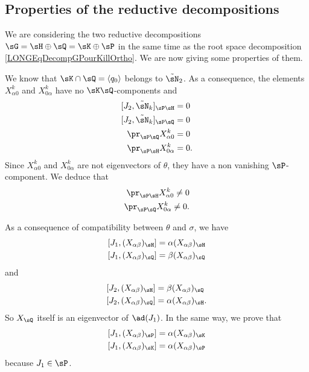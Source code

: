 %
\subsection{Properties of the reductive decompositions}
%
\label{LONGSubSecPropRedDecompQH}

We are considering the two reductive decompositions $\sG=\sH\oplus\sQ=\sK\oplus\sP$ in the same time as the root space decomposition \eqref{LONGEqDecompGPourKillOrtho}. We are now giving some properties of them.


We know that $\sK\cap\sQ=\langle q_0\rangle$ belongs to $\tilde\sN_2$. As a consequence, the elements $X^k_{\alpha 0}$ and $X^k_{0\alpha}$ have no $\sK\sQ$-components and
\begin{equation}
	\begin{aligned}[]
		[J_2,\tilde\sN_k]_{\sP\sH}&=0\\
		[J_2,\tilde\sN_k]_{\sP\sQ}&=0\\
		\pr_{\sP\sQ}X_{\alpha 0}^k&=0\\
		\pr_{\sP\sH}X_{0\alpha }^k&=0.
	\end{aligned}
\end{equation}
Since $X^k_{\alpha 0}$ and $X^k_{0\alpha}$ are not  eigenvectors of $\theta$, they have a non vanishing $\sP$-component. We deduce that
\begin{equation}				\label{LONGEqXalphazeroaduPH}
	\begin{aligned}[]
		\pr_{\sP\sH}X^k_{\alpha 0}\neq 0\\
		\pr_{\sP\sQ}X^k_{0 \alpha }\neq 0.
	\end{aligned}
\end{equation}

As a consequence of compatibility between $\theta$ and $\sigma$, we have
\begin{equation}
	\begin{aligned}[]
		[J_1,(X_{\alpha\beta})_{\sH}]&=\alpha (X_{\alpha\beta})_{\sH}\\
		[J_1,(X_{\alpha\beta})_{\sQ}]&=\beta (X_{\alpha\beta})_{\sQ}
	\end{aligned}
\end{equation}
and
\begin{equation}		\label{LONGSubEqsJdeuxXalphaneta}
	\begin{aligned}[]
		[J_2,(X_{\alpha\beta})_{\sH}]&=\beta (X_{\alpha\beta})_{\sQ}\\
		[J_2,(X_{\alpha\beta})_{\sQ}]&=\alpha (X_{\alpha\beta})_{\sH}.
	\end{aligned}
\end{equation}
So $X_{\sQ}$ itself is an eigenvector of $\ad(J_1)$. In the same way, we prove that
\begin{equation}		\label{LONGEqJUnXabPK}
	\begin{aligned}[]
		[J_1,(X_{\alpha\beta})_{\sP}]=\alpha(X_{\alpha\beta})_{\sK}\\
		[J_1,(X_{\alpha\beta})_{\sK}]=\alpha(X_{\alpha\beta})_{\sP}
	\end{aligned}
\end{equation}
because $J_1\in\sP$.

